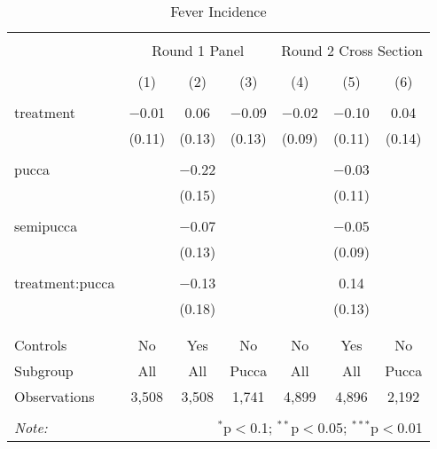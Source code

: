 
\begin{table}[!htbp] \centering 
  \caption{Fever Incidence} 
  \label{tbl:Fever Incidence} 
\begin{tabular}{@{\extracolsep{5pt}}lcccccc} 
\\[-1.8ex]\hline 
\hline \\[-1.8ex] 
 & \multicolumn{3}{c}{Round 1 Panel} & \multicolumn{3}{c}{Round 2 Cross Section} \\ 
\\[-1.8ex] & (1) & (2) & (3) & (4) & (5) & (6)\\ 
\hline \\[-1.8ex] 
 treatment & $-$0.01 & 0.06 & $-$0.09 & $-$0.02 & $-$0.10 & 0.04 \\ 
  & (0.11) & (0.13) & (0.13) & (0.09) & (0.11) & (0.14) \\ 
  & & & & & & \\ 
 pucca &  & $-$0.22 &  &  & $-$0.03 &  \\ 
  &  & (0.15) &  &  & (0.11) &  \\ 
  & & & & & & \\ 
 semipucca &  & $-$0.07 &  &  & $-$0.05 &  \\ 
  &  & (0.13) &  &  & (0.09) &  \\ 
  & & & & & & \\ 
 treatment:pucca &  & $-$0.13 &  &  & 0.14 &  \\ 
  &  & (0.18) &  &  & (0.13) &  \\ 
  & & & & & & \\ 
\hline \\[-1.8ex] 
Controls & No & Yes & No & No & Yes & No \\ 
Subgroup & All & All & Pucca & All & All & Pucca \\ 
Observations & 3,508 & 3,508 & 1,741 & 4,899 & 4,896 & 2,192 \\ 
\hline 
\hline \\[-1.8ex] 
\textit{Note:}  & \multicolumn{6}{r}{$^{*}$p$<$0.1; $^{**}$p$<$0.05; $^{***}$p$<$0.01} \\ 
\end{tabular} 
\end{table} 
